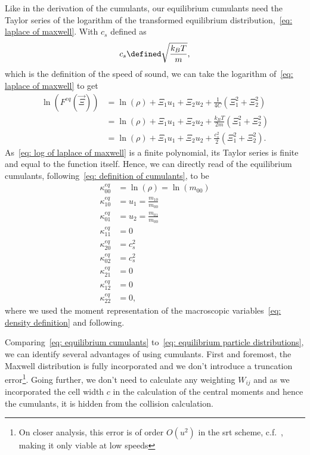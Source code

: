 
Like in the derivation of the cumulants, our equilibrium cumulants need the Taylor series of the logarithm of the transformed equilibrium distribution,~\eqref{eq: laplace of maxwell}.
With $c_s$ defined as
\begin{equation*}
  c_s \defined \sqrt{\frac{k_B T}{m}},
\end{equation*}
which is the definition of the speed of sound, we can take the logarithm of~\eqref{eq: laplace of maxwell} to get
\begin{equation}
  \label{eq: log of laplace of maxwell}
  \begin{aligned}
    \ln(F^{eq}(\vec{\Xi}))
      & = \ln(\rho) + \Xi_1 u_1 + \Xi_2 u_2 + \frac{1}{4C}\left(\Xi_1^2 + \Xi_2^2 \right) \\
      & = \ln(\rho) + \Xi_1 u_1 + \Xi_2 u_2 + \frac{k_B T}{2m}\left(\Xi_1^2 + \Xi_2^2 \right) \\
      & = \ln(\rho) + \Xi_1 u_1 + \Xi_2 u_2 + \frac{c_s^2}{2}\left(\Xi_1^2 + \Xi_2^2 \right).
  \end{aligned}
\end{equation}
As~\eqref{eq: log of laplace of maxwell} is a finite polynomial, its Taylor series is finite and equal to the function itself.
Hence, we can directly read of the equilibrium cumulants, following~\eqref{eq: definition of cumulants}, to be
\begin{equation}
  \label{eq: equilibrium cumulants}
  \begin{aligned}
    \kappa_{00}^{eq} & = \ln(\rho) = \ln(m_{00}) \\
    \kappa_{10}^{eq} & = u_1 = \frac{m_{10}}{m_{00}} \\
    \kappa_{01}^{eq} & = u_2 = \frac{m_{01}}{m_{00}}\\
    \kappa_{11}^{eq} & = 0 \\
    \kappa_{20}^{eq} & = c_s^2  \\
    \kappa_{02}^{eq} & = c_s^2  \\
    \kappa_{21}^{eq} & = 0 \\
    \kappa_{12}^{eq} & = 0 \\
    \kappa_{22}^{eq} & = 0,
  \end{aligned}
\end{equation}
where we used the moment representation of the macroscopic variables~\eqref{eq: density definition} and following.

Comparing~\eqref{eq: equilibrium cumulants} to~\eqref{eq: equilibrium particle distributions}, we can identify several advantages of using cumulants.
First and foremost, the Maxwell distribution is fully incorporated and we don't introduce a truncation error\footnote{On closer analysis, this error is of order $O(u^2)$ in the \gls{srt} scheme, c.f.~\cite[page 178]{wolf2000lattice}, making it only viable at low speeds}.
Going further, we don't need to calculate any weighting $W_{ij}$ and as we incorporated the cell width $c$ in the calculation of the central moments and hence the cumulants, it is hidden from the collision calculation.


